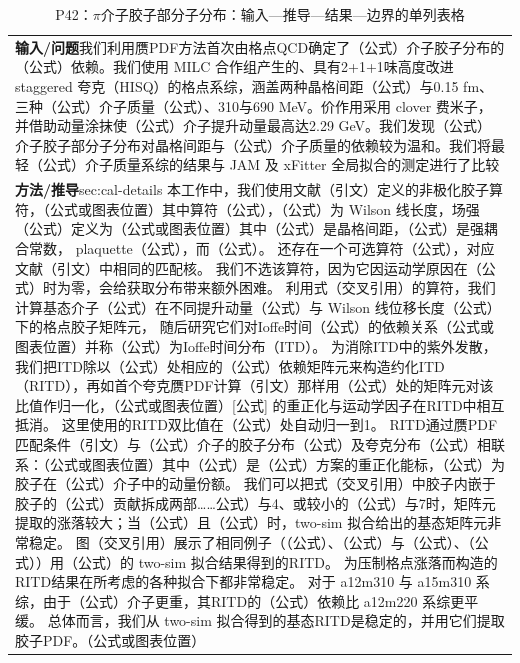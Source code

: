 \documentclass[UTF8,11pt,oneside]{ctexbook}
\begin{document}
\begin{table}[htbp]
  \centering
  \caption*{P42：$\pi$介子胶子部分子分布：输入—推导—结果—边界的单列表格}
  \small
  \begin{tabular}{@{}p{}@{}}
    \toprule
    \textbf{输入/问题}\quad 我们利用赝PDF方法首次由格点QCD确定了（公式）介子胶子分布的（公式）依赖。我们使用 MILC 合作组产生的、具有2+1+1味高度改进 staggered 夸克（HISQ）的格点系综，涵盖两种晶格间距（公式）与0.15 fm、三种（公式）介子质量（公式）、310与690 MeV。价作用采用 clover 费米子，并借助动量涂抹使（公式）介子提升动量最高达2.29 GeV。我们发现（公式）介子胶子部分子分布对晶格间距与（公式）介子质量的依赖较为温和。我们将最轻（公式）介子质量系综的结果与 JAM 及 xFitter 全局拟合的测定进行了比较 \\
    \textbf{方法/推导}\quad sec:cal-details 本工作中，我们使用文献（引文）定义的非极化胶子算符，（公式或图表位置）其中算符（公式），（公式）为 Wilson 线长度，场强（公式）定义为（公式或图表位置）其中（公式）是晶格间距，（公式）是强耦合常数， plaquette（公式），而（公式）。 还存在一个可选算符（公式），对应文献（引文）中相同的匹配核。 我们不选该算符，因为它因运动学原因在（公式）时为零，会给获取分布带来额外困难。 利用式（交叉引用）的算符，我们计算基态介子（公式）在不同提升动量（公式）与 Wilson 线位移长度（公式）下的格点胶子矩阵元， 随后研究它们对Ioffe时间（公式）的依赖关系（公式或图表位置）并称（公式）为Ioffe时间分布（ITD）。 为消除ITD中的紫外发散，我们把ITD除以（公式）处相应的（公式）依赖矩阵元来构造约化ITD（RITD），再如首个夸克赝PDF计算（引文）那样用（公式）处的矩阵元对该比值作归一化，（公式或图表位置）[公式] 的重正化与运动学因子在RITD中相互抵消。 这里使用的RITD双比值在（公式）处自动归一到1。 RITD通过赝PDF匹配条件（引文）与（公式）介子的胶子分布（公式）及夸克分布（公式）相联系：（公式或图表位置）其中（公式）是（公式）方案的重正化能标，（公式）为胶子在（公式）介子中的动量份额。 我们可以把式（交叉引用）中胶子内嵌于胶子的（公式）贡献拆成两部……公式）与4、或较小的（公式）与7时，矩阵元提取的涨落较大；当（公式）且（公式）时，two-sim 拟合给出的基态矩阵元非常稳定。 图（交叉引用）展示了相同例子（（公式）、（公式）与（公式）、（公式））用（公式）的 two-sim 拟合结果得到的RITD。 为压制格点涨落而构造的RITD结果在所考虑的各种拟合下都非常稳定。 对于 a12m310 与 a15m310 系综，由于（公式）介子更重，其RITD的（公式）依赖比 a12m220 系综更平缓。 总体而言，我们从 two-sim 拟合得到的基态RITD是稳定的，并用它们提取胶子PDF。（公式或图表位置） \\

\end{tabular}
\end{table}
\end{document}
